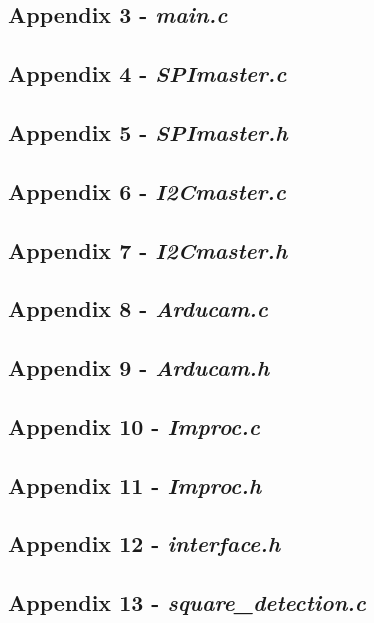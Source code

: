 \subsection{Appendix 3 - \textit{main.c}}


\subsection{Appendix 4 - \textit{SPImaster.c}}


\subsection{Appendix 5 - \textit{SPImaster.h}}


\subsection{Appendix 6 - \textit{I2Cmaster.c}}


\subsection{Appendix 7 - \textit{I2Cmaster.h}}


\subsection{Appendix 8 - \textit{Arducam.c}}


\subsection{Appendix 9 - \textit{Arducam.h}}


\subsection{Appendix 10 - \textit{Improc.c}}


\subsection{Appendix 11 - \textit{Improc.h}}


\subsection{Appendix 12 - \textit{interface.h}}


\subsection{Appendix 13 - \textit{square\_detection.c}}

 

